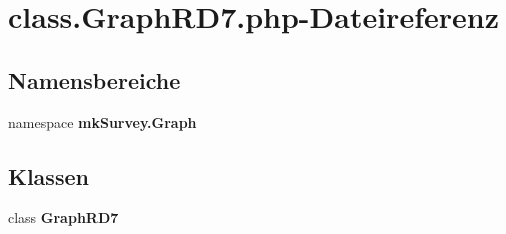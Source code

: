 \section{class.GraphRD7.php-Dateireferenz}
\label{class_8GraphRD7_8php}
\subsection*{Namensbereiche}
\begin{CompactItemize}
\item 
namespace {\bf mkSurvey.Graph}
\end{CompactItemize}
\subsection*{Klassen}
\begin{CompactItemize}
\item 
class {\bf GraphRD7}
\end{CompactItemize}
